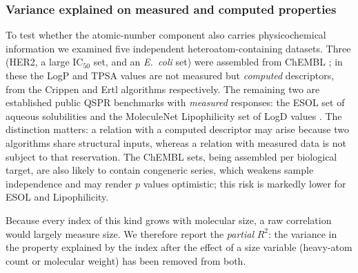 \documentclass[11pt,a4paper]{article}
\theoremstyle{plain}
\theoremstyle{definition}
\theoremstyle{remark}
\begin{document}
\subsubsection*{Variance explained on measured and computed properties}

To test whether the atomic-number component also carries physicochemical
information we examined five independent heteroatom-containing datasets. Three
(HER2, a large IC$_{50}$ set, and an \textit{E.~coli} set) were assembled from
ChEMBL \cite{chembl2024}; in these the LogP and TPSA values are not measured but
\emph{computed} descriptors, from the Crippen \cite{wildman1999} and Ertl
\cite{ertl2000} algorithms respectively. The remaining two are established public
QSPR benchmarks with \emph{measured} responses: the ESOL set of aqueous
solubilities \cite{delaney2004} and the MoleculeNet Lipophilicity set of LogD
values \cite{wu2018}. The distinction matters: a relation with a computed
descriptor may arise because two algorithms share structural inputs, whereas a
relation with measured data is not subject to that reservation. The ChEMBL sets,
being assembled per biological target, are also likely to contain congeneric
series, which weakens sample independence and may render $p$ values optimistic;
this risk is markedly lower for ESOL and Lipophilicity.

Because every index of this kind grows with molecular size, a raw correlation
would largely measure size. We therefore report the \emph{partial} $R^2$: the
variance in the property explained by the index after the effect of a size
variable (heavy-atom count or molecular weight) has been removed from both.
\end{document}
